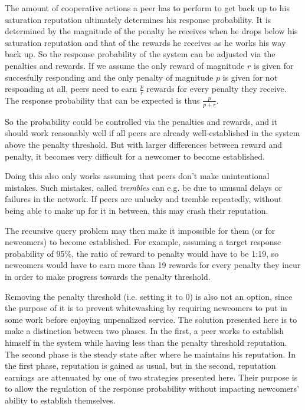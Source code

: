 The amount of cooperative actions a peer has to perform to get back up to his
saturation reputation ultimately determines his response probability. It is
determined by the magnitude of the penalty he receives when he drops below his
saturation reputation and that of the rewards he receives as he works his way
back up. So the response probability of the system can be adjusted via the
penalties and rewards. If we assume the only reward of magnitude $r$ is given
for succesfully responding and the only penalty of magnitude $p$ is given for
not responding at all, peers need to earn $\frac{p}{r}$ rewards for every
penalty they receive. The response probability that can be expected is thus
$\frac{p}{p + r}$.

So the probability could be controlled via the penalties and rewards, and it
should work reasonably well if all peers are already well-established in the
system above the penalty threshold. But with larger differences between
reward and penalty, it becomes very difficult for a newcomer to become
established.

Doing this also only works assuming that peers don't make unintentional
mistakes. Such mistakes, called \emph{trembles} can e.g. be due to unusual
delays or failures in the network. If peers are unlucky and tremble repeatedly,
without being able to make up for it in between, this may crash their
reputation.

The recursive query problem may then make it impossible for them (or for
newcomers) to become established. For example, assuming a target response
probability of 95\%, the ratio of reward to penalty would have to be 1:19, so
newcomers would have to earn more than 19 rewards for every penalty they incur
in order to make progress towards the penalty threshold.

Removing the penalty threshold (i.e. setting it to 0) is also not an option,
since the purpose of it is to prevent whitewashing by requiring newcomers to put
in some work before enjoying unpenalized service. The solution presented here is
to make a distinction between two phases. In the first, a peer works to
establish himself in the system while having less than the penalty threshold
reputation. The second phase is the steady state after where he maintains his
reputation. In the first phase, reputation is gained as usual, but in the
second, reputation earnings are attenuated by one of two strategies presented
here. Their purpose is to allow the regulation of the response probability
without impacting newcomers' ability to establish themselves.

